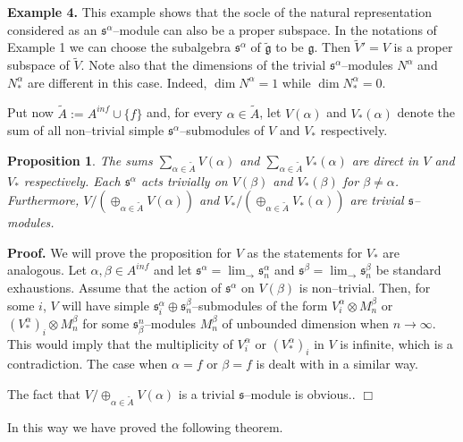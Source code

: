 \documentclass[oneside,leqno,12pt]{article}
\newcounter{theorem}
\newtheorem{prop}[theo]{Proposition}
\newenvironment{proof}{ \noindent \textbf{Proof.}}{\hfill $\Box$}
\def\gg{\mathfrak{g}}
\def\gs{\mathfrak{s}}
\renewcommand{\ss}{\mathfrak{s}}
\renewcommand{\gg}{\mathfrak{g}}
\newcommand{\inj}{\displaystyle \lim_\to}
\begin{document}
\textbf{Example 4.} This example shows that the socle of the natural representation considered as an $\gs^\alpha$--module can
also be a proper subspace. In the notations of Example 1 we can choose the subalgebra $\gs^\alpha$ of $\tilde{\gg}$ to be $\gg$.
Then $\tilde{V}' = V$ is a proper subspace of $\tilde{V}$.
Note also that the dimensions of the trivial $\gs^\alpha$--modules $N^\alpha$ and $N_*^\alpha$ are different in this case. Indeed,
$\dim N^\alpha = 1$ while $\dim N_*^\alpha = 0$.



Put now $\tilde A:=A^{inf}\cup \{f\}$ and, for every $\alpha \in \tilde{A}$,  let $V(\alpha)$ and $V_*(\alpha)$ 
denote the sum of all non--trivial simple $\gs^\alpha$--submodules of $V$ and $V_*$ respectively.

\begin{prop}\label{prop2.6}
The sums  $\sum_{\alpha\in\tilde A}V(\alpha)$ and $\sum_{\alpha\in\tilde A}V_*(\alpha)$
are direct in $V$ and $V_*$ respectively. Each $\ss^\alpha$ acts trivially on $V(\beta)$ and $V_*(\beta)$ for $\beta \neq \alpha$. Furthermore,
$V/(\oplus_{\alpha\in\tilde A}V(\alpha))$ and 
$V_*/(\oplus_{\alpha\in\tilde A}V_*(\alpha))$ are  trivial $\ss$--modules.
\end{prop}
\begin{proof} We will prove the proposition for $V$ as the statements for $V_*$ are analogous.
Let $\alpha, \beta \in A^{inf}$ and let   $\gs^\alpha = \inj \gs^\alpha_n$ and $\gs^\beta = \inj \gs^\beta_n$ be standard exhaustions.
Assume that the action of $\ss^\alpha$ on $V(\beta)$ is non--trivial. 
Then, for some $i$, $V$ will have simple $\ss_i^\alpha\oplus\ss^\beta_n$--submodules of the form 
$V_i^\alpha\otimes M_n^\beta$ or $(V_*^\alpha)_i\otimes M_n^\beta$ for some $\ss_\beta^n$--modules $M_n^\beta$ of unbounded dimension when $n\to\infty$. 
This would imply that the multiplicity of $V_i^\alpha$ or $(V_*^\alpha)_i$ in $V$ is infinite, which is a contradiction. The case when $\alpha=f$ or $\beta=f$ is dealt with in a similar way. 

The fact that $V/\oplus_{\alpha\in\tilde A}V(\alpha)$ is a trivial $\ss$--module is obvious..
\end{proof}

In this way we have proved the following theorem. 
\end{document}
